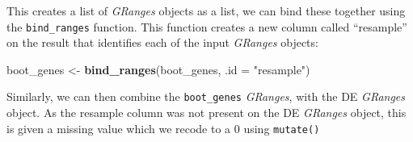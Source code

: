 \documentclass[
  9pt,
  a4paper,
]{extarticle}
\newenvironment{Shaded}{\begin{snugshade}}{\end{snugshade}}
\newcommand{\DataTypeTok}[1]{\textcolor[rgb]{0.13,0.29,0.53}{#1}}
\newcommand{\KeywordTok}[1]{\textcolor[rgb]{0.13,0.29,0.53}{\textbf{#1}}}
\newcommand{\NormalTok}[1]{#1}
\newcommand{\OperatorTok}[1]{\textcolor[rgb]{0.81,0.36,0.00}{\textbf{#1}}}
\newcommand{\StringTok}[1]{\textcolor[rgb]{0.31,0.60,0.02}{#1}}
\begin{document}
This creates a list of \emph{GRanges} objects as a list, we can bind these together
using the \texttt{bind\_ranges} function. This function creates a new column called
``resample'' on the result that identifies each of the input \emph{GRanges} objects:

\begin{Shaded}
\begin{Highlighting}[]
\NormalTok{boot_genes <-}\StringTok{ }\KeywordTok{bind_ranges}\NormalTok{(boot_genes, }\DataTypeTok{.id =} \StringTok{"resample"}\NormalTok{)}
\end{Highlighting}
\end{Shaded}

Similarly, we can then combine the \texttt{boot\_genes} \emph{GRanges}, with the DE
\emph{GRanges} object. As the resample column was not present on the DE \emph{GRanges}
object, this is given a missing value which we recode to a 0 using \texttt{mutate()}

\begin{Shaded}
\end{Shaded}
\end{document}
